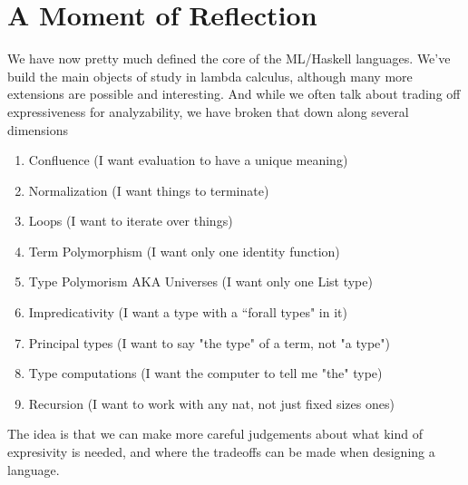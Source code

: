 \documentclass[12pt]{article}
\begin{document}
\section{A Moment of Reflection}
We have now pretty much defined the core of the ML/Haskell languages.
We've build the main objects of study in lambda calculus, although many more extensions are possible and interesting. 
And while we often talk about trading off expressiveness for analyzability, we have broken that down along several dimensions
\begin{enumerate}
    \item Confluence (I want evaluation to have a unique meaning)
    \item Normalization (I want things to terminate)
    \item Loops (I want to iterate over things)
    \item Term Polymorphism (I want only one identity function)
    \item Type Polymorism AKA Universes (I want only one List type)
    \item Impredicativity (I want a type with a ``forall types" in it)
    \item Principal types (I want to say "the type" of a term, not "a type")
    \item Type computations (I want the computer to tell me "the" type)
    \item Recursion (I want to work with any nat, not just fixed sizes ones)
\end{enumerate}
The idea is that we can make more careful judgements about what kind of expresivity is needed, and where the tradeoffs can be made when designing a language.
\end{document}
